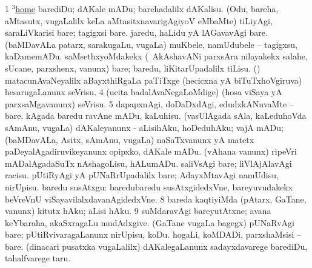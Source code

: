 \begin{center}
\noindent
\gl{\pagu}
\expl{}
\bmng
\bnum
\num{1}  \hyperref{kandict_h.pdf}{H}{home(3) nuga(5)}{$^3$home}  
  
\banum
{} barediDu; dAKale mADu; barehadalilx dAKalisu. 
 (Odu, bareha, aMtasutx, \mo vugaLalilx keLa aMtasitxnavarigAgiyoV eMbaMte) tiLiyAgi, saraLiVkarisi bare; tagigxsi bare. 
 jaredu, haLidu yA lAGavavAgi bare. 
 (baMDavALa patarx, sarakugaLu, \mo vugaLa) muKbele, namUdubele -- tagigxsu, kaDamemADu. 
\eanum
\numie
{}  
\banum
{} saMsethxyoMdakekx (\kanmu\ AkAshavANi parxsAra nilayakekx salahe, sUcane, parxshenx, \mo vanunx) bare; baredu, liKitarUpadalilx tiLisu. 
 (\ame) matacunAvaNeyalilx aBayxthiRgaLa paTiTxge (hecicxna yA biTuTxhoVgiruva) hesarugaLanunx seVrisu. 
\eanum
\numie
\num{4}  (ucita badalAvaNegaLoMdige) (hosa viSaya yA parxsaMgavanunx) seVrisu. 
\num{5}  dapapxnAgi, doDaDxdAgi, edudxkANuvaMte -- bare. 
  
\banum
{} kAgada baredu ravAne mADu, kaLuhisu. 
 (vasUlAgada sAla, kaLeduhoVda sAmAnu, \mo vugaLa) dAKaleyanunx - aLisihAku, hoDeduhAku; vajA mADu; (baMDavALa, Asitx, sAmAnu, \mo vugaLa) naSaTxvanunx yA matetx paDeyalAgadiruvikeyanunx opipxko, dAKale mADu. 
 (vAhana \mo vanunx) ripeVri mADalAgadaSuTx nAshagoLisu, hALumADu. 
 saliVsAgi bare; liVlAjAlavAgi racisu. 
\eanum
\numie
{}  
\banum
{} pUtiRyAgi yA pUNaRrUpadalilx bare; AdayxMtavAgi namUdisu, nirUpisu. 
 baredu susAtxgu:  baredubaredu susAtxgidedxVne, bareyuvudakekx beVreVnU viSayavilalxdavanAgidedxVne. 
\eanum
\numie
\num{8}  bareda kaqtiyiMda (pAtarx, GaTane, \mo vanunx) kitutx hAku; aLisi hAku. 
\num{9}  suMdaravAgi bareyutAtxne; avana keYbaraha, akaSxragaLu mudAdxgive. 
  
\banum
{} (GaTane \mo vugaLa bagegx) pUNaRvAgi bare; pUtiRvivaragaLanunx nirUpisu, koDu. 
 hogaLi, koMDADi, parxshaMsisi -- bare. 
 (dinacari pusatxka \mo vugaLalilx) dAKalegaLanunx sadayxdavarege barediDu, tahalfvarege taru. 
\eanum
\numie
\enum
\emng
\eentry

\bentry
{} 
\gl{\nA}
\enum
\emng


\end{center}
